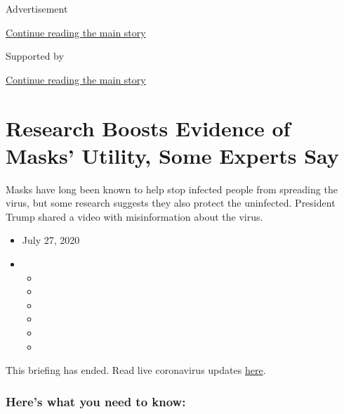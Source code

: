 Advertisement

\protect\hyperlink{after-top}{Continue reading the main story}

Supported by

\protect\hyperlink{after-sponsor}{Continue reading the main story}

\hypertarget{research-boosts-evidence-of-masks-utility-some-experts-say}{%
\section{Research Boosts Evidence of Masks' Utility, Some Experts
Say}\label{research-boosts-evidence-of-masks-utility-some-experts-say}}

Masks have long been known to help stop infected people from spreading
the virus, but some research suggests they also protect the uninfected.
President Trump shared a video with misinformation about the virus.

\begin{itemize}
\item
  July 27, 2020
\item
  \begin{itemize}
  \item
  \item
  \item
  \item
  \item
  \item
  \end{itemize}
\end{itemize}

This briefing has ended. Read live coronavirus updates
\href{https://www.nytimes.com/2020/07/28/world/coronavirus-covid-19.html}{here}.

\hypertarget{heres-what-you-need-to-know}{%
\subsubsection{Here's what you need to
know:}\label{heres-what-you-need-to-know}}

